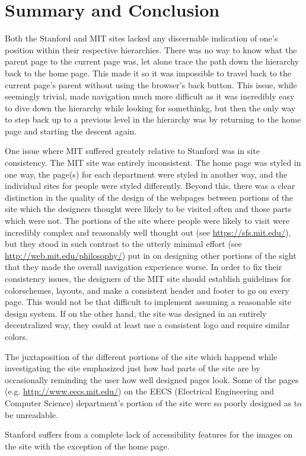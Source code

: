 \section*{Summary and Conclusion}

Both the Stanford and MIT sites lacked any discernable indication of one's position within their respective hierarchies. 
There was no way to know what the parent page to the current page was, let alone trace the path down the hierarchy back to 
the home page. This made it so it was impossible to travel back to the current page's parent without using the browser's back 
button. This issue, while seemingly trivial, made navigation much more difficult as it was incredibly easy to dive down the 
hierarchy while looking for somethinkg, but then the only way to step back up to a previous level in the hierarchy was by returning
to the home page and starting the descent again. 

One issue where MIT suffered greately relative to Stanford was in site consistency. The MIT site was entirely inconsistent. The
home page was styled in one way, the page(s) for each department were styled in another way, and the individual sites for people 
were styled differently. Beyond this, there was a clear distinction in the quality of the design of the webpages between portions
of the site which the designers thought were likely to be visited often and those parts which were not. The portions of the site 
where people were likely to visit were incredibly complex and reasonably well thought out (see \url{https://sfs.mit.edu/}), 
but they stood in such contrast to the utterly minimal effort (see \url{http://web.mit.edu/philosophy/}) put in on designing other portions of the sight that they made the overall navigation experience worse. In order to fix their consistency 
issues, the designers of the MIT site should establish guidelines for colorschemes, layouts, and make a consistent header and 
footer to go on every page. This would not be that difficult to implement assuming a reasonable site design system. If on the other
hand, the site was designed in an entirely decentralized way, they could at least use a consistent logo and require similar colors.

The juxtaposition of the different portions of the site which happend while investigating the site emphasized just how bad parts 
of the site are by occasionally reminding the user how well designed pages look. Some of the pages (e.g. 
\url{http://www.eecs.mit.edu/}) on the EECS (Electrical Engineering and Computer Science) department's portion of the 
site were so poorly designed as to be unreadable. 

Stanford suffers from a complete lack of accessibility features for the images on the site with the exception of the home page. 